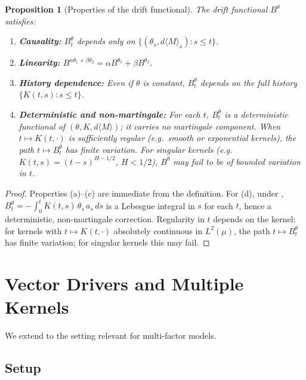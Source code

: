 \documentclass[11pt]{article}
\theoremstyle{plain}
\newtheorem{proposition}{Proposition}[section]
\theoremstyle{definition}
\theoremstyle{remark}
\newcommand{\bracket}[1]{\langle #1 \rangle}
\begin{document}
\begin{proposition}[Properties of the drift functional]\label{prop:drift-properties}
The drift functional $B^\theta$ satisfies:
\begin{enumerate}[label=(\alph*)]
\item \textbf{Causality:} $B_t^\theta$ depends only on $\{(\theta_s, d\bracket{M}_s) : s \le t\}$.
\item \textbf{Linearity:} $B^{\alpha\theta_1 + \beta\theta_2} = \alpha B^{\theta_1} + \beta B^{\theta_2}$.
\item \textbf{History dependence:} Even if $\theta$ is constant, $B_t^\theta$
depends on the full history $\{K(t,s) : s \le t\}$.
\item \textbf{Deterministic and non-martingale:} For each $t$, $B_t^\theta$
is a deterministic functional of $(\theta, K, d\bracket{M})$; it carries no
martingale component. When $t \mapsto K(t,\cdot)$ is sufficiently regular
(e.g.\ smooth or exponential kernels), the path $t \mapsto B_t^\theta$ has
finite variation. For singular kernels (e.g.\ $K(t,s) = (t-s)^{H-1/2}$,
$H < 1/2$), $B^\theta$ may fail to be of bounded variation in $t$.
\end{enumerate}
\end{proposition}

\begin{proof}
Properties (a)--(c) are immediate from the definition. For (d),
under , $B_t^\theta = -\int_0^t K(t,s)\,\theta_s\,a_s\,ds$
is a Lebesgue integral in $s$ for each $t$, hence a deterministic,
non-martingale correction. Regularity in $t$ depends on the kernel:
for kernels with $t \mapsto K(t,\cdot)$ absolutely continuous in
$L^2(\mu)$, the path $t \mapsto B_t^\theta$ has finite variation;
for singular kernels this may fail.
\end{proof}

\section{Vector Drivers and Multiple Kernels}\label{sec:vector}

We extend to the setting relevant for multi-factor models.

\subsection{Setup}
\end{document}

